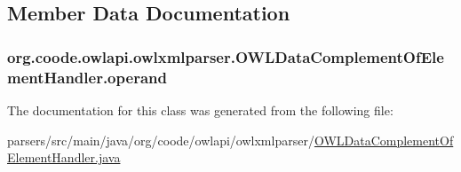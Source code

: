 \subsection{Member Data Documentation}
\hypertarget{classorg_1_1coode_1_1owlapi_1_1owlxmlparser_1_1_o_w_l_data_complement_of_element_handler_aa2808c045b267649488a0eb7f4bc9074}{
\subsubsection[{operand}]{ org.\-coode.\-owlapi.\-owlxmlparser.\-O\-W\-L\-Data\-Complement\-Of\-Element\-Handler.\-operand\hspace{0.3cm}{\ttfamily [private]}}}\label{classorg_1_1coode_1_1owlapi_1_1owlxmlparser_1_1_o_w_l_data_complement_of_element_handler_aa2808c045b267649488a0eb7f4bc9074}


The documentation for this class was generated from the following file\-:\begin{DoxyCompactItemize}
\item 
parsers/src/main/java/org/coode/owlapi/owlxmlparser/\hyperlink{_o_w_l_data_complement_of_element_handler_8java}{O\-W\-L\-Data\-Complement\-Of\-Element\-Handler.\-java}\end{DoxyCompactItemize}
